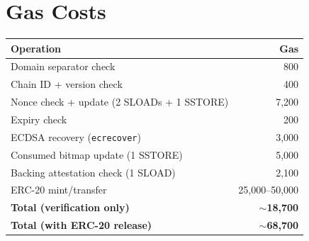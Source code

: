 \section{Gas Costs}


\begin{center}
\begin{tabular}{lr}
\toprule
\textbf{Operation} & \textbf{Gas} \\
\midrule
Domain separator check & 800 \\
Chain ID + version check & 400 \\
Nonce check + update (2 SLOADs + 1 SSTORE) & 7,200 \\
Expiry check & 200 \\
ECDSA recovery (\texttt{ecrecover}) & 3,000 \\
Consumed bitmap update (1 SSTORE) & 5,000 \\
Backing attestation check (1 SLOAD) & 2,100 \\
ERC-20 mint/transfer & 25,000--50,000 \\
\midrule
\textbf{Total (verification only)} & \textbf{$\sim$18,700} \\
\textbf{Total (with ERC-20 release)} & \textbf{$\sim$68,700} \\
\bottomrule
\end{tabular}
\end{center}

